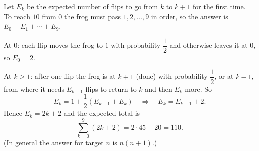 Let $E_k$ be the expected number of flips to go from $k$ to $k+1$ for the first time. To reach $10$ from $0$ the frog must pass $1,2,\dots,9$ in order, so the answer is $E_0+E_1+\cdots+E_9$.

At $0$: each flip moves the frog to $1$ with probability $\dfrac{1}{2}$ and otherwise leaves it at $0$, so $E_0=2$.

At $k\ge1$: after one flip the frog is at $k+1$ (done) with probability $\dfrac{1}{2}$, or at $k-1$, from where it needs $E_{k-1}$ flips to return to $k$ and then $E_k$ more. So
\[
E_k=1+\dfrac{1}{2}\left(E_{k-1}+E_k\right)\quad\Longrightarrow\quad E_k=E_{k-1}+2 .
\]
Hence $E_k=2k+2$ and the expected total is
\[
\sum_{k=0}^{9}(2k+2)=2\cdot45+20=\boxed{110}.
\]
(In general the answer for target $n$ is $n(n+1)$.)
